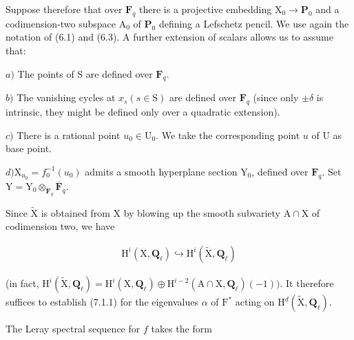 \documentclass[10pt,leqno]{article}
\begin{document}
\noindent Suppose therefore that over \(\mathbf{F}_{q}\) there is a projective embedding \(\mathrm{X}_{0}\longrightarrow \mathbf{P}_{0}\) and a codimension-two subspace \(\mathrm{A}_{0}\) of \(\mathbf{P}_{0}\) defining a Lefschetz pencil. We use again the notation of (6.1) and (6.3). A further extension of scalars allows us to assume that:\par

\noindent \(a)\) The points of \(\mathrm{S}\) are defined over \(\mathbf{F}_{q}\).\par

\noindent \(b)\) The vanishing cycles at \(x_{s} (s\in \mathrm{S})\) are defined over \(\mathbf{F}_{q}\) (since only \(\pm \delta \) is intrinsic, they might be defined only over a quadratic extension).\par

\noindent \(c)\) There is a rational point \(u_{0}\in \mathrm{U}_{0}\). We take the corresponding point \(u\) of \(\mathrm{U}\) as base point.\par

\noindent \(d) \mathrm{X}_{u_{0}}=f_{0}^{- 1}(u_{0})\) admits a smooth hyperplane section \(\mathrm{Y}_{0}\), defined over \(\mathbf{F}_{q}\). Set \(\mathrm{Y}=\mathrm{Y}_{0}\otimes _{\mathbf{F}_{q}}\overline{\mathbf{F}}_{q}\).\par

\noindent Since \(\widetilde{\mathrm{X}}\) is obtained from \(\mathrm{X}\) by blowing up the smooth subvariety \(\mathrm{A}\cap \mathrm{X}\) of codimension two, we have\par

\begin{equation*}\begin{gathered}\mathrm{H}^{i}(\mathrm{X},\mathbf{Q}_{\ell }) \hookrightarrow  \mathrm{H}^{i}(\widetilde{\mathrm{X}},\mathbf{Q}_{\ell })\end{gathered}\end{equation*}

\noindent (in fact, \(\mathrm{H}^{i}(\widetilde{\mathrm{X}},\mathbf{Q}_{\ell })=\mathrm{H}^{i}(\mathrm{X},\mathbf{Q}_{\ell })\oplus \mathrm{H}^{i- 2}(\mathrm{A}\cap \mathrm{X},\mathbf{Q}_{\ell })(- 1))\). It therefore suffices to establish (7.1.1) for the eigenvalues \(\alpha \) of \(\mathrm{F}^{*}\) acting on \(\mathrm{H}^{d}(\widetilde{\mathrm{X}},\mathbf{Q}_{\ell })\).\par

\noindent The Leray spectral sequence for \(f\) takes the form\par
\end{document}
